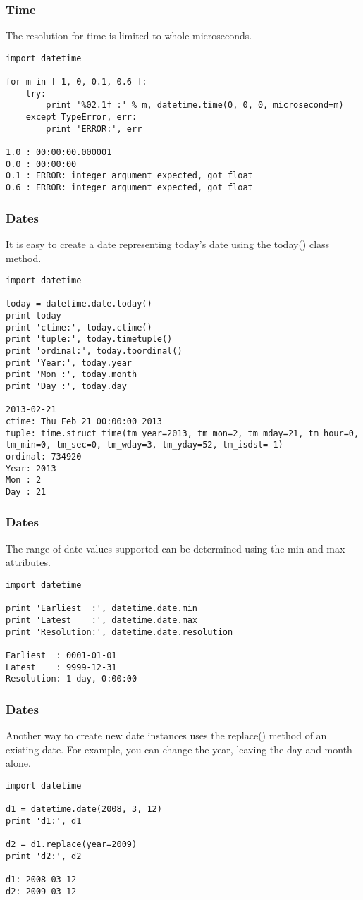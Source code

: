 \begin{frame}[fragile]\frametitle{ Time}
The resolution for time is limited to whole microseconds.
\begin{lstlisting}
import datetime

for m in [ 1, 0, 0.1, 0.6 ]:
    try:
        print '%02.1f :' % m, datetime.time(0, 0, 0, microsecond=m)
    except TypeError, err:
        print 'ERROR:', err

1.0 : 00:00:00.000001
0.0 : 00:00:00
0.1 : ERROR: integer argument expected, got float
0.6 : ERROR: integer argument expected, got float        
\end{lstlisting}
\end{frame}

\begin{frame}[fragile]\frametitle{ Dates}
It is easy to create a date representing today's date using the today() class method.
\begin{lstlisting}
import datetime

today = datetime.date.today()
print today
print 'ctime:', today.ctime()
print 'tuple:', today.timetuple()
print 'ordinal:', today.toordinal()
print 'Year:', today.year
print 'Mon :', today.month
print 'Day :', today.day

2013-02-21
ctime: Thu Feb 21 00:00:00 2013
tuple: time.struct_time(tm_year=2013, tm_mon=2, tm_mday=21, tm_hour=0, tm_min=0, tm_sec=0, tm_wday=3, tm_yday=52, tm_isdst=-1)
ordinal: 734920
Year: 2013
Mon : 2
Day : 21
\end{lstlisting}
\end{frame}

\begin{frame}[fragile]\frametitle{ Dates}
The range of date values supported can be determined using the min and max attributes.
\begin{lstlisting}
import datetime

print 'Earliest  :', datetime.date.min
print 'Latest    :', datetime.date.max
print 'Resolution:', datetime.date.resolution

Earliest  : 0001-01-01
Latest    : 9999-12-31
Resolution: 1 day, 0:00:00
\end{lstlisting}
\end{frame}

\begin{frame}[fragile]\frametitle{ Dates}
Another way to create new date instances uses the replace() method of an existing date. For example, you can change the year, leaving the day and month alone.
\begin{lstlisting}
import datetime

d1 = datetime.date(2008, 3, 12)
print 'd1:', d1

d2 = d1.replace(year=2009)
print 'd2:', d2

d1: 2008-03-12
d2: 2009-03-12
\end{lstlisting}
\end{frame}

